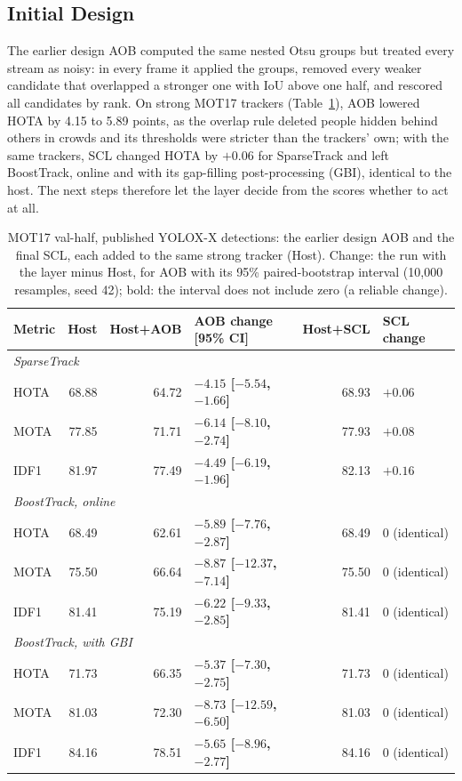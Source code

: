 \subsection{Initial Design}\label{sec:scl-prior}
The earlier design AOB computed the same nested Otsu groups but treated every stream as noisy: in every frame it applied the groups, removed every weaker candidate that overlapped a stronger one with IoU above one half, and rescored all candidates by rank. On strong MOT17 trackers (Table~\ref{tab:scl-prior}), AOB lowered HOTA by 4.15 to 5.89 points, as the overlap rule deleted people hidden behind others in crowds and its thresholds were stricter than the trackers' own; with the same trackers, SCL changed HOTA by $+0.06$ for SparseTrack and left BoostTrack, online and with its gap-filling post-processing (GBI), identical to the host. The next steps therefore let the layer decide from the scores whether to act at all.

\begin{table}[tbp]
\centering
\caption{MOT17 val-half, published YOLOX-X detections: the earlier design AOB and the final SCL, each added to the same strong tracker (Host). Change: the run with the layer minus Host, for AOB with its 95\% paired-bootstrap interval (10,000 resamples, seed 42); bold: the interval does not include zero (a reliable change).}
\label{tab:scl-prior}
\begin{tabular}{lrrlrl}
\toprule
Metric & Host & Host+AOB & AOB change [95\% CI] & Host+SCL & SCL change\\
\midrule
\multicolumn{6}{l}{\textit{SparseTrack} \cite{liu2025sparsetrack}}\\
\quad HOTA & 68.88 & 64.72 & \textbf{$-4.15$ [$-5.54$, $-1.66$]} & 68.93 & $+0.06$\\
\quad MOTA & 77.85 & 71.71 & \textbf{$-6.14$ [$-8.10$, $-2.74$]} & 77.93 & $+0.08$\\
\quad IDF1 & 81.97 & 77.49 & \textbf{$-4.49$ [$-6.19$, $-1.96$]} & 82.13 & $+0.16$\\
\multicolumn{6}{l}{\textit{BoostTrack, online} \cite{stanojevic2024boosttrack}}\\
\quad HOTA & 68.49 & 62.61 & \textbf{$-5.89$ [$-7.76$, $-2.87$]} & 68.49 & 0 (identical)\\
\quad MOTA & 75.50 & 66.64 & \textbf{$-8.87$ [$-12.37$, $-7.14$]} & 75.50 & 0 (identical)\\
\quad IDF1 & 81.41 & 75.19 & \textbf{$-6.22$ [$-9.33$, $-2.85$]} & 81.41 & 0 (identical)\\
\multicolumn{6}{l}{\textit{BoostTrack, with GBI} \cite{stanojevic2024boosttrack}}\\
\quad HOTA & 71.73 & 66.35 & \textbf{$-5.37$ [$-7.30$, $-2.75$]} & 71.73 & 0 (identical)\\
\quad MOTA & 81.03 & 72.30 & \textbf{$-8.73$ [$-12.59$, $-6.50$]} & 81.03 & 0 (identical)\\
\quad IDF1 & 84.16 & 78.51 & \textbf{$-5.65$ [$-8.96$, $-2.77$]} & 84.16 & 0 (identical)\\
\bottomrule
\end{tabular}
\end{table}

